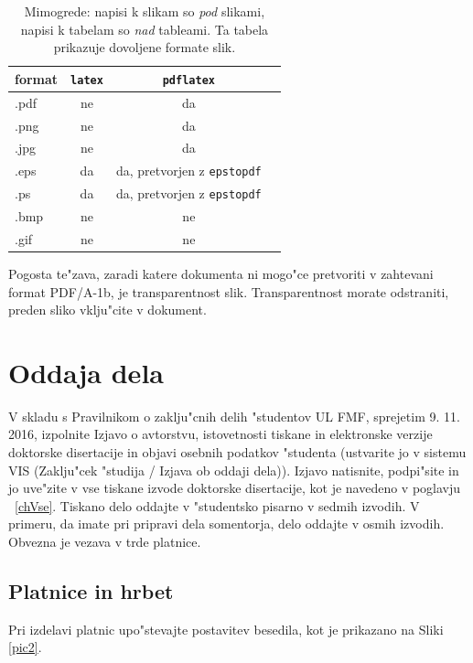 \begin{table}[h]
\caption[Dovoljeni formati slik]{Mimogrede: napisi k slikam so {\sl pod\/} slikami, 
napisi k tabelam so {\sl nad\/} tableami.  Ta tabela prikazuje
dovoljene formate slik.}
\label{tbl1}
\begin{center}
\begin{tabular}{l|ccc}
format & {\tt latex}  & {\tt pdflatex} \\ \hline
.pdf & ne  & da  \\
.png & ne  & da  \\
.jpg & ne & da  \\
.eps & da & da, pretvorjen z {\tt epstopdf} \\
.ps & da & da, pretvorjen z {\tt epstopdf}  \\
.bmp & ne & ne \\
.gif & ne & ne 
\end{tabular}
\end{center}
\end{table}

Pogosta te"zava, zaradi katere dokumenta ni mogo"ce pretvoriti v zahtevani format PDF/A-1b, je transparentnost slik. 
Transparentnost morate odstraniti, preden sliko vklju"cite v dokument. 

%
\chapter{Oddaja dela}
\label{chOdd}

V skladu s Pravilnikom o zaklju"cnih delih "studentov \acs{UL} \acs{FMF}, sprejetim 9. 11. 2016, 
izpolnite Izjavo o avtorstvu, istovetnosti tiskane in elektronske verzije doktorske disertacije in objavi osebnih podatkov "studenta 
(ustvarite jo v sistemu \acs{VIS} (Zaklju"cek "studija / Izjava ob oddaji dela)).
Izjavo natisnite, podpi"site in jo uve"zite v vse tiskane izvode doktorske disertacije, kot je navedeno v poglavju ~\ref{chVse}. 
Tiskano delo oddajte v "studentsko pisarno v sedmih izvodih. 
V primeru, da imate pri pripravi dela somentorja, delo oddajte v osmih izvodih. Obvezna je vezava v trde platnice.

\section{Platnice in hrbet}

Pri izdelavi platnic upo"stevajte postavitev besedila, kot je prikazano na Sliki \ref{pic2}.


